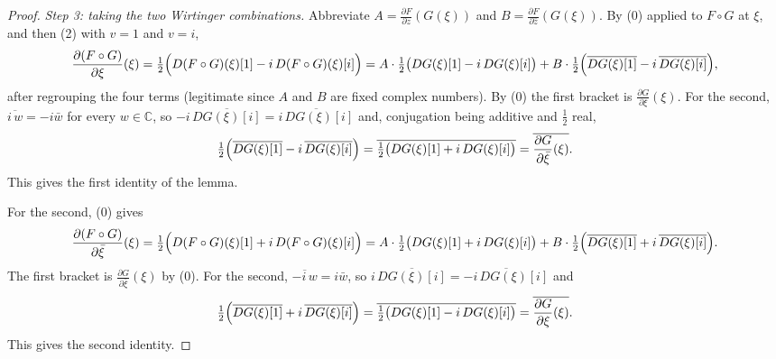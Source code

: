 \begin{proof}
\emph{Step 3: taking the two Wirtinger combinations.}  Abbreviate
$A=\frac{\partial F}{\partial z}(G(\xi))$ and
$B=\frac{\partial F}{\partial\bar z}(G(\xi))$.  By (0) applied to $F\circ G$ at
$\xi$, and then (2) with $v=1$ and $v=i$,
\[
  \frac{\partial(F\circ G)}{\partial\xi}(\xi)
  =\tfrac12\Bigl(D(F\circ G)(\xi)[1]-i\,D(F\circ G)(\xi)[i]\Bigr)
  =A\cdot\tfrac12\bigl(DG(\xi)[1]-i\,DG(\xi)[i]\bigr)
   +B\cdot\tfrac12\Bigl(\overline{DG(\xi)[1]}-i\,\overline{DG(\xi)[i]}\Bigr),
\]
after regrouping the four terms (legitimate since $A$ and $B$ are fixed complex
numbers).  By (0) the first bracket is
$\frac{\partial G}{\partial\xi}(\xi)$.  For the second, $\overline{i\,w}=-i\bar w$
for every $w\in\mathbb{C}$, so $-i\,\overline{DG(\xi)[i]}=\overline{i\,DG(\xi)[i]}$
and, conjugation being additive and $\tfrac12$ real,
\[
  \tfrac12\Bigl(\overline{DG(\xi)[1]}-i\,\overline{DG(\xi)[i]}\Bigr)
  =\overline{\tfrac12\bigl(DG(\xi)[1]+i\,DG(\xi)[i]\bigr)}
  =\overline{\frac{\partial G}{\partial\bar\xi}(\xi)} .
\]
This gives the first identity of the lemma.

For the second, (0) gives
\[
  \frac{\partial(F\circ G)}{\partial\bar\xi}(\xi)
  =\tfrac12\Bigl(D(F\circ G)(\xi)[1]+i\,D(F\circ G)(\xi)[i]\Bigr)
  =A\cdot\tfrac12\bigl(DG(\xi)[1]+i\,DG(\xi)[i]\bigr)
   +B\cdot\tfrac12\Bigl(\overline{DG(\xi)[1]}+i\,\overline{DG(\xi)[i]}\Bigr).
\]
The first bracket is $\frac{\partial G}{\partial\bar\xi}(\xi)$ by (0).  For the
second, $\overline{-i\,w}=i\bar w$, so
$i\,\overline{DG(\xi)[i]}=\overline{-i\,DG(\xi)[i]}$ and
\[
  \tfrac12\Bigl(\overline{DG(\xi)[1]}+i\,\overline{DG(\xi)[i]}\Bigr)
  =\overline{\tfrac12\bigl(DG(\xi)[1]-i\,DG(\xi)[i]\bigr)}
  =\overline{\frac{\partial G}{\partial\xi}(\xi)} .
\]
This gives the second identity.
\end{proof}

